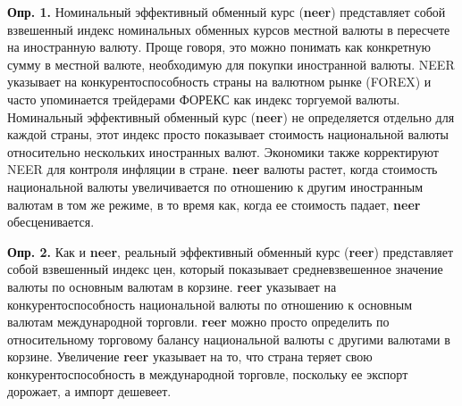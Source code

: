 \documentclass{article}
\begin{document}
\textbf{Опр. 1.} Номинальный эффективный обменный курс (\textbf{neer}) представляет собой взвешенный индекс номинальных обменных курсов местной валюты в пересчете на иностранную валюту. Проще говоря, это можно понимать как конкретную сумму в местной валюте, необходимую для покупки иностранной валюты. NEER указывает на конкурентоспособность страны на валютном рынке (FOREX) и часто упоминается трейдерами ФОРЕКС как индекс торгуемой валюты. Номинальный эффективный обменный курс (\textbf{neer}) не определяется отдельно для каждой страны, этот индекс просто показывает стоимость национальной валюты относительно нескольких иностранных валют. Экономики также корректируют NEER для контроля инфляции в стране. \textbf{neer} валюты растет, когда стоимость национальной валюты увеличивается по отношению к другим иностранным валютам в том же режиме, в то время как, когда ее стоимость падает, \textbf{neer} обесценивается.

\textbf{Опр. 2.} Как и \textbf{neer}, реальный эффективный обменный курс (\textbf{reer}) представляет собой взвешенный индекс цен, который показывает средневзвешенное значение валюты по основным валютам в корзине. \textbf{reer} указывает на конкурентоспособность национальной валюты по отношению к основным валютам международной торговли. \textbf{reer} можно просто определить по относительному торговому балансу национальной валюты с другими валютами в корзине. Увеличение \textbf{reer} указывает на то, что страна теряет свою конкурентоспособность в международной торговле, поскольку ее экспорт дорожает, а импорт дешевеет.
\end{document}
